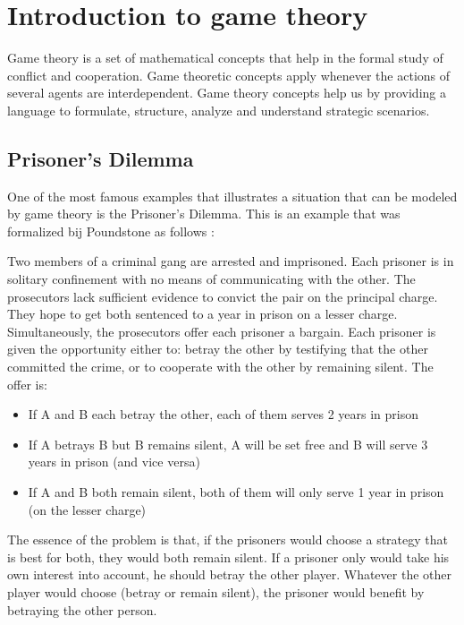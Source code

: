 \section{Introduction to game theory}
Game theory is a set of mathematical concepts that help in the formal study of conflict and cooperation. Game theoretic concepts apply whenever the actions of several agents are interdependent. Game theory concepts help us by providing a language to formulate, structure, analyze and understand strategic scenarios.

\subsection{Prisoner's Dilemma}
One of the most famous examples that illustrates a situation that can be modeled by game theory is the Prisoner's Dilemma. This is an example that was formalized bij Poundstone as follows \cite{poundstone}: 

\begin{displayquote}
Two members of a criminal gang are arrested and imprisoned. Each prisoner is in solitary confinement with no means of communicating with the other. The prosecutors lack sufficient evidence to convict the pair on the principal charge. They hope to get both sentenced to a year in prison on a lesser charge. Simultaneously, the prosecutors offer each prisoner a bargain. Each prisoner is given the opportunity either to: betray the other by testifying that the other committed the crime, or to cooperate with the other by remaining silent. The offer is:
	\begin{itemize}
		\item If A and B each betray the other, each of them serves 2 years in prison
		\item If A betrays B but B remains silent, A will be set free and B will serve 3 years in prison (and vice versa)
		\item If A and B both remain silent, both of them will only serve 1 year in prison (on the lesser charge)
	\end{itemize}	
\end{displayquote}

The essence of the problem is that, if the prisoners would choose a strategy that is best for both, they would both remain silent. If a prisoner only would take his own interest into account, he should betray the other player. Whatever the other player would choose (betray or remain silent), the prisoner would benefit by betraying the other person.

